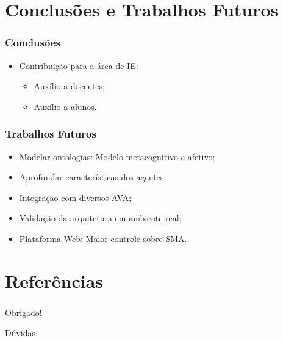 \documentclass{beamer}
\begin{document}
\section{Conclusões e Trabalhos Futuros}
\begin{frame}
    \frametitle{Conclusões}
    \begin{itemize}
        \item Contribuição para a área de IE:
	\begin{itemize}
	        \item Auxílio a docentes;
	        \item Auxílio a alunos.
	\end{itemize}
    \end{itemize}
\end{frame}

\begin{frame}
    \frametitle{Trabalhos Futuros}
    \begin{itemize}
        \item Modelar ontologias: Modelo metacognitivo e afetivo;
        \item Aprofundar características dos agentes; %
        \item Integração com diversos AVA;
	\item Validação da arquitetura em ambiente real;
        \item Plataforma Web: Maior controle sobre SMA.
    \end{itemize}
\end{frame}



\nocite{fabriciobuzzeto,weiser2,saocarlos,yang,hewitt,violajones}

\section{Referências}


\begin{frame}
    \frametitle{ }
    \centerline{Obrigado!}
    \centerline{Dúvidas.}
\end{frame}
\end{document}
